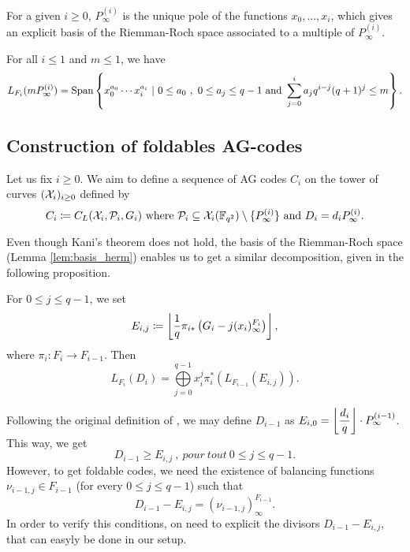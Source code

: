 \documentclass[10pt]{article}
\begin{document}
For a given $i \geq 0$, $P^{(i)}_{\infty}$ is the unique pole of the functions $x_0,...,x_i$, which gives an explicit basis of the Riemman-Roch space associated to a multiple of $P^{(i)}_{\infty}$.

\begin{lemma}\label{lem:basis_herm}
For all $i \leq 1$ and $m \leq 1$, we have 
\[L_{F_i}(mP^{(i)}_{\infty}) = \operatorname{Span}\left\{x_0^{a_0} \cdots x_i^{a_i} \ | \ 0 \leq a_0 \ , \ 0 \leq a_j \leq q-1 \text{ and } \sum\limits_{j=0}^i a_jq^{i-j}(q+1)^j \leq m \right\}.\]
\end{lemma}

\subsection{Construction of foldables AG-codes}

Let us fix $i \geq 0$. We aim to define a sequence of AG codes $C_i$ on the tower of curves $(\mathcal{X}_i)_{i\geq 0}$ defined by 
\[C_i \coloneqq C_L(\mathcal{X}_i,\mathcal{P}_{i},G_i) \text{ where } \mathcal{P}_{i} \subseteq \mathcal{X}_i(\mathbb{F}_{q^2}) \setminus \{P_\infty^{(i)}\} \text{ and } D_i = d_iP^{(i)}_{\infty}.\]

Even though Kani's theorem does not hold, the basis of the Riemman-Roch space (Lemma \ref{lem:basis_herm}) enables us to get a similar decomposition, given in the following proposition.

\begin{proposition} 
	For $0 \leq j \leq q-1$, we set
	\[E_{i,j} \coloneqq \left\lfloor \frac{1}{q} \pi_{i*}\left(G_i-j(x_i)^{F_i}_{\infty}\right)\right\rfloor,\]
	where $\pi_i : F_i \rightarrow F_{i-1}$. Then 
\[L_{F_i}(D_i) = \bigoplus\limits_{j=0}^{q-1} x_i^j \pi_i^*\left(L_{F_{i-1}}(E_{i,j})\right).\]
\end{proposition}

Following the original definition of \cite{BN20}, we may define $D_{i-1}$ as $E_{i,0} = \left\lfloor \dfrac{d_i}{q} \right\rfloor \cdot P^{(i-1)}_{\infty}$. This way, we get 
\[D_{i-1} \geq E_{i,j} \ , \ pour \ tout \ 0 \leq j \leq q-1.\] 
However, to get foldable codes, we need the existence of balancing functions  $\nu_{i-1,j} \in F_{i-1}$ (for every  $0 \leq j \leq q-1$) such that 
\begin{equation}\label{eq:balancing_fct_herm}
	D_{i-1}-E_{i,j} = (\nu_{i-1,j})^{F_{i-1}}_{\infty}.
\end{equation}
In order to verify this conditions, on need to explicit the divisors $D_{i-1}-E_{i,j}$, that can easyly be done in our setup.
\end{document}
